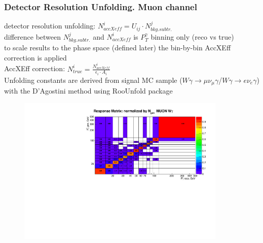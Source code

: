 \begin{frame}\frametitle{Detector Resolution Unfolding. Muon channel}
\tiny
detector resolution unfolding: $N^i_{accXeff}=U_{ij} \cdot N^j_{bkg.subtr.}$ \\
difference between  $N^j_{bkg.subtr.}$ and $N^i_{accXeff}$ is $P_T^{\gamma}$ binning only (reco vs true)\\
to scale results to the phase space (defined later) the bin-by-bin AccXEff correction is applied\\
AccXEff correction: $N^i_{true}= \frac{N^i_{accXeff}}{\epsilon_{i}\cdot A_i}$\\
\scriptsize Unfolding constants are derived from signal MC sample ($W\gamma\rightarrow\mu\nu_{\mu}\gamma$/$W\gamma\rightarrow{e}\nu_{e}\gamma$) with the D'Agostini method using RooUnfold package\\
\begin{figure}[htb]
  \begin{center}
   \includegraphics[width=0.89\textwidth]{../figs/figs_v11/MUON_WGamma/Constants/cResponseMatr_MUON_WGamma__yield_pm_stat.pdf}\\
  \label{fig:respMatrices_Wg}
  \end{center}
\end{figure}
\end{frame}%

